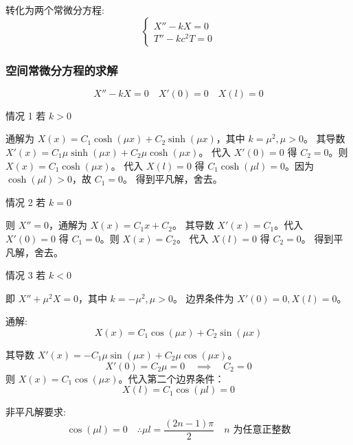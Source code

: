 \documentclass[a4paper, 12pt, oneside]{article} %
\numberwithin{subsection}{section}
\numberwithin{subsubsection}{subsection}
\theoremstyle{plain}
\theoremstyle{definition}
\theoremstyle{remark}
\begin{document}
		转化为两个常微分方程:
		\begin{equation} \label{eq:ode_mixed2}
			\begin{cases}
				X'' - kX = 0 \\
				T'' - k c^2 T = 0
			\end{cases}
		\end{equation}
		
		\subsubsection{空间常微分方程的求解}
		\begin{equation}
			X'' - kX = 0 \quad X'(0) = 0 \quad X(l) = 0
		\end{equation}
		
		情况 1 \quad 若 \(k > 0\)
		
		通解为 \(X(x) = C_1 \cosh(\mu x) + C_2 \sinh(\mu x)\)，其中 \(k = \mu^2, \mu>0\)。
		其导数 $X'(x) = C_1 \mu \sinh(\mu x) + C_2 \mu \cosh(\mu x)$。
		代入 $X'(0)=0$ 得 $C_2=0$。则 $X(x) = C_1 \cosh(\mu x)$。
		代入 $X(l)=0$ 得 $C_1 \cosh(\mu l) = 0$。因为 $\cosh(\mu l)>0$，故 $C_1=0$。
		得到平凡解，舍去。
		
		情况 2 \quad 若 \(k = 0\)
		
		则 \(X'' = 0\)，通解为 $X(x) = C_1 x + C_2$。
		其导数 $X'(x) = C_1$。代入 $X'(0)=0$ 得 $C_1=0$。则 $X(x) = C_2$。
		代入 $X(l)=0$ 得 $C_2=0$。
		得到平凡解，舍去。
		
		情况 3 \quad 若 \(k < 0\)
		
		即 \(X'' + \mu^2 X = 0\)，其中 \(k = -\mu^2, \mu > 0\)。
		边界条件为 $X'(0) = 0, X(l) = 0$。
		
		通解:
		\begin{equation}
			X(x) = C_1 \cos(\mu x) + C_2 \sin(\mu x)
		\end{equation}
		
		其导数 $X'(x) = -C_1 \mu \sin(\mu x) + C_2 \mu \cos(\mu x)$。
		\begin{equation}
			X'(0) = C_2 \mu = 0 \quad \implies \quad C_2 = 0
		\end{equation}
		则 $X(x) = C_1 \cos(\mu x)$。代入第二个边界条件：
		\begin{equation}
			X(l) = C_1 \cos(\mu l) = 0
		\end{equation}
		
		非平凡解要求:
		\begin{equation*}
			\cos(\mu l) = 0 \quad \therefore \mu l = \frac{(2n-1)\pi}{2} \quad n \text{ 为任意正整数}
		\end{equation*}
		
\end{document}
